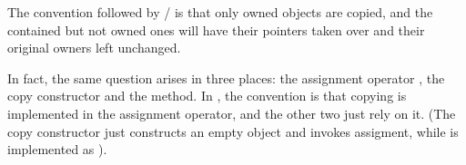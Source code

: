 The convention followed by / is that
only owned objects are copied, and the contained but not owned ones
will have their pointers taken over and their original owners
left unchanged.

In fact, the same question arises in three places:
the assignment operator , the copy constructor
and the  method.
In {\opp}, the convention is that copying is implemented
in the assignment operator, and the other two just rely on it.
(The copy constructor just constructs an empty object and
invokes assigment, while 
is implemented as ).

%
%
%
%
%
%
%


